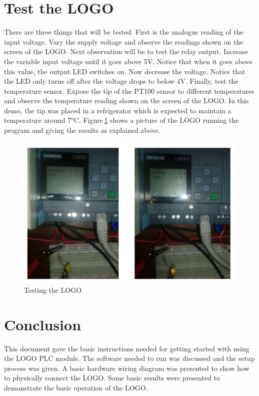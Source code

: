 \documentclass[11pt]{IEEEtran}
\begin{document}
\section{Test the LOGO}
\noindent There are three things that will be tested. First is the analogue reading of the input voltage. Vary the supply voltage and observe the readings shown on the screen of the LOGO. Next observation will be to test the relay output. Increase the variable input voltage until it goes above 5V. Notice that when it goes above this value, the output LED switches on. Now decrease the voltage. Notice that the LED only turns off after the voltage drops to below 4V. Finally, test the temperature sensor. Expose the tip of the PT100 sensor to different temperatures and observe the temperature reading shown on the screen of the LOGO. In this demo, the tip was placed in a refrigerator which is expected to maintain a temperature around 7$^o$C. Figure\,\ref{fig:testing} shows a picture of the LOGO running the program and giving the results as explained above. 

\begin{figure}[H]
	\centering
	\includegraphics[scale=0.6]{Result.pdf}
	\caption{Testing the LOGO}
	\label{fig:testing}
\end{figure}


\section{Conclusion}
\noindent This document gave the basic instructions needed for getting started with using the LOGO PLC module. The software needed to run was discussed and the setup process was given. A basic hardware wiring diagram was presented to show how to physically connect the LOGO. Some basic results were presented to demonstrate the basic operation of the LOGO.
 
\end{document}
